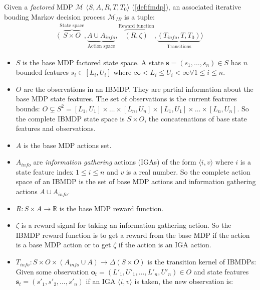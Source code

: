 \begin{definition}\label{def:ibmdp}
Given a \textit{factored} MDP $\mathcal{M}$ $\langle S, A, R, T, T_0 \rangle$ (\ref{def:fmdp}), an associated iterative bouding Markov decision process $\mathcal{M}_{IB}$ is a tuple:
\begin{align*}
    \langle \overbrace{S \times O}^{\text{State space}}, \underbrace{A \cup A_{info}}_{\text{Action space}}, \overbrace{(R, \zeta)}^{\text{Reward function}}, \underbrace{(T_{info}, T, T_0)}_{\text{Transitions}}\rangle
\end{align*}

\begin{itemize}
\item $S$ is the base MDP factored state space. A state $\boldsymbol{s} = (s_1, \dots, s_n)\in S$ has $n$ bounded features $s_i \in [L_i, U_i]$ where $\infty < L_i \leq U_i < \infty \forall 1\leq i \leq n$.
\item $O$ are the observations in an IBMDP. They are partial information about the base MDP state features. The set of observations is the current features bounds: $O\subsetneq S^2 =  [L_1, U_1]\times \dots \times [L_n, U_n] \times [L_1, U_1]\times \dots \times [L_n, U_n]$. So the complete IBMDP state space is $S \times O$, the concatenations of base state features and observations.
\item $A$ is the base MDP actions set.
\item $A_{info}$ are \textit{information gathering} actions (IGAs) of the form $\langle i, v \rangle$ where $i$ is a state feature index $1 \leq i \leq n$ and $v$ is a real number. So the complete action space of an IBMDP is the set of base MDP actions and information gathering actions $A \cup A_{info}$.
\item $R: S\times A \rightarrow \mathbb{R}$ is the base MDP reward function.
\item $\zeta$ is a reward signal for taking an information gathering action. So the IBMDP reward function is to get a reward from the base MDP if the action is a base MDP action or to get $\zeta$ if the action is an IGA action.
\item $T_{info}: S\times O \times( A_{info} \cup A )\rightarrow \Delta (S\times O)$ is the transition kernel of IBMDPs: 
Given some observation $\boldsymbol{o}_t = (L'_1, U'_1, \dots, L'_n, U'_n) \in O$ and state features $\boldsymbol{s}_t=(s'_1, s'_2, \dots, s'_n)$ if an IGA $\langle i, v \rangle$ is taken, the new observation is:
\begin{align*}

\end{align*}
\end{itemize}
\end{definition}
